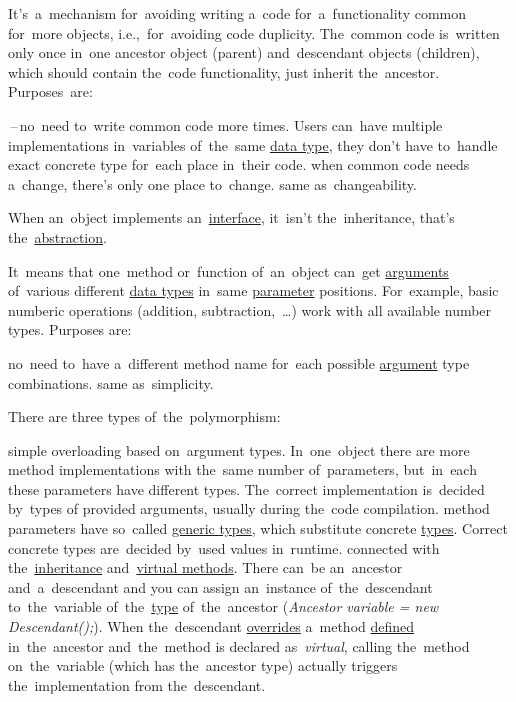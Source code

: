 \label{inheritance}
It's~a~mechanism for~avoiding writing a~code for~a~functionality common for~more objects, i.e.,~for~avoiding code duplicity.
The~common code is~written only once in~one ancestor object (parent) and~descendant objects (children), which should contain the~code functionality, just inherit the~ancestor.
Purposes~are:
\begin{itemize}
    \,--\,no~need to~write common code more times.
            Users can~have multiple implementations in~variables of~the~same \hyperref[datatypes]{data type}, they don't have to~handle exact concrete type for~each place in~their code.
     when common code needs a~change, there's only one place to~change.
     same as~changeability.
\end{itemize}

\warning When an~object implements an~\hyperref[javainterface]{interface}, it~isn't the~inheritance, that's the~\hyperref[abstraction]{abstraction}.

\label{polymorphism}
It~means that one~method or~function of~an~object can~get \hyperref[parameterargument]{arguments} of~various different \hyperref[datatypes]{data types} in~same \hyperref[parameterargument]{parameter} positions.
For~example, basic numberic operations (addition, subtraction,~\dots) work with all available number types.
Purposes are:
\begin{itemize}
     no~need to~have a~different method name for~each possible \hyperref[parameterargument]{argument} type combinations.
     same as~simplicity.
\end{itemize}

\noindent There are three types of~the~polymorphism:
\begin{itemize}
     simple overloading based on~argument types.
             In~one~object there are more method implementations with the~same number of~parameters, but~in~each these parameters have different types.
             The~correct implementation is~decided by~types of provided arguments, usually during the~code compilation.
     method parameters have so~called \hyperref[javagenerics]{generic types}, which substitute concrete \hyperref[datatypes]{types}.
             Correct concrete types are~decided by~used values in~runtime.
     connected with the~\hyperref[inheritance]{inheritance} and~\hyperref[javavirtualmethods]{virtual methods}.
             There can~be an~ancestor and~a~descendant and you can assign an~instance of~the~descendant to~the~variable of~the~\hyperref[datatype]{type} of~the~ancestor (\textit{Ancestor variable = new Descendant();}).
             When the~descendant \hyperref[javaoverride]{overrides} a~method \hyperref[declarationdefinition]{defined} in~the~ancestor and~the~method is declared as~\textit{virtual}, calling the~method on~the~variable (which has the~ancestor type) actually triggers the~implementation from the~descendant.
\end{itemize}

